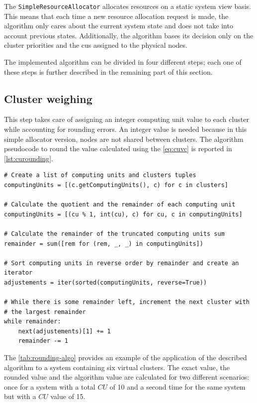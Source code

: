 The \texttt{SimpleResourceAllocator} allocates resources on a static system view basis. This means that each time a new resource allocation request is made, the algorithm only cares about the current system state and does not take into account previous states. Additionally, the algorithm bases its decision only on the cluster priorities and the \glspl{cu} assigned to the physical nodes.

The implemented algorithm can be divided in four different steps; each one of these steps is further described in the remaining part of this section.

\subsection{Cluster weighing}
\label{sec:cluster-weighing}

This step takes care of assigning an integer computing unit value to each cluster while accounting for rounding errors. An integer value is needed because in this simple allocator version, nodes are not shared between clusters. The algorithm pseudocode to round the value calculated using the \autoref{eq:cuvc} is reported in \autoref{lst:curounding}.
	
\lstset{language=python,caption=CU rounding algorithm,label=lst:curounding}
\begin{lstlisting}
# Create a list of computing units and clusters tuples
computingUnits = [(c.getComputingUnits(), c) for c in clusters]

# Calculate the quotient and the remainder of each computing unit
computingUnits = [(cu % 1, int(cu), c) for cu, c in computingUnits]

# Calculate the remainder of the truncated computing units sum
remainder = sum([rem for (rem, _, _) in computingUnits])

# Sort computing units in reverse order by remainder and create an iterator
adjustements = iter(sorted(computingUnits, reverse=True))

# While there is some remainder left, increment the next cluster with
# the largest remainder
while remainder:
	next(adjustements)[1] += 1
	remainder -= 1
\end{lstlisting}

The \autoref{tab:rounding-algo} provides an example of the application of the described algorithm to a system containing six virtual clusters. The exact value, the rounded value and the algorithm value are calculated for two different scenarios: once for a system with a total $CU$ of 10 and a second time for the same system but with a $CU$ value of 15.

